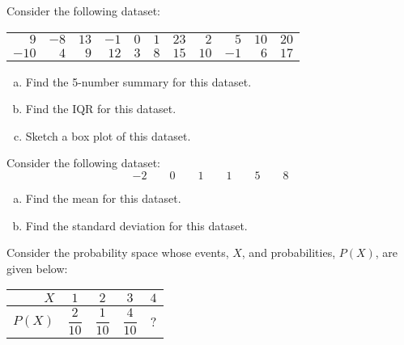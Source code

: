 \documentclass[11pt,letterpaper]{article}
\begin{document}

 Consider the following dataset: \par
	\begin{table}[h]
	\centering
	\begin{tabular}{rrrrrrrrrrr}
	$9$ & $-8$ & $13$ & $-1$ & $0$ & $1$ & $23$ & $2$ & $5$ & $10$ & $20$ \\
	$-10$ & $4$ & $9$ & $12$ & $3$ & $8$ & $15$ & $10$ & $-1$ & $6$ & $17$ 
	\end{tabular}
	\end{table} \par

\begin{enumerate}[(a)]
\item Find the 5-number summary for this dataset. 
\item Find the IQR for this dataset. 
\item Sketch a box plot of this dataset. 
\end{enumerate}



\newpage



 Consider the following dataset:
	\[
	-2 \qquad 0 \qquad 1 \qquad 1 \qquad 5 \qquad 8
	\]

\begin{enumerate}[(a)]
\item Find the mean for this dataset. 
\item Find the standard deviation for this dataset. 
\end{enumerate}



\newpage



 Consider the probability space whose events, $X$, and probabilities, $P(X)$, are given below: \par
	\begin{table}[h]
	\centering
	\begin{tabular}{r||cccc}
	$X$ & $1$ & $2$ & $3$ & $4$ \\ \hline \rule[-1.5ex]{0pt}{5ex}
	$P(X)$ & $\dfrac{2}{10}$ & $\dfrac{1}{10}$ & $\dfrac{4}{10}$ & ? 
	\end{tabular}
	\end{table} \par
\end{document}
